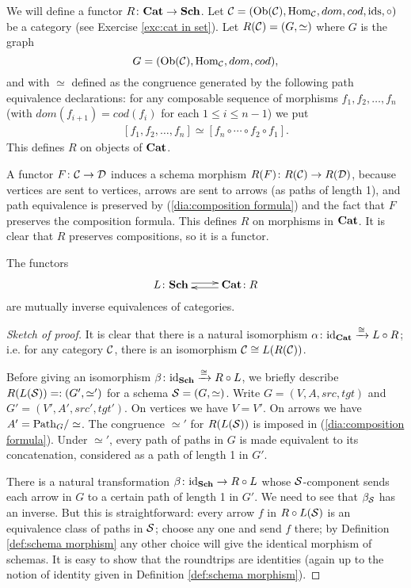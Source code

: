 \documentclass[CT4S-EN-RU]{subfiles}
\begin{document}
\begin{construction}

We will define a functor $R\colon{\bf Cat}\rightarrow{\bf Sch}$. Let $\mathcal{C}=(\textnormal{Ob}(\mathcal{C}),\textnormal{Hom}_\mathcal{C},dom,cod,\textnormal{ids},\circ)$ be a category (see Exercise \ref{exc:cat in set}). Let $R(\mathcal{C})=(G,\simeq)$ where $G$ is the graph $$G=(\textnormal{Ob}(\mathcal{C}),\textnormal{Hom}_\mathcal{C},dom,cod),$$ and with $\simeq$ defined as the congruence generated by the following path equivalence declarations: for any composable sequence of morphisms $f_1,f_2,\ldots,f_n$ (with $dom(f_{i+1})=cod(f_i)$ for each $1\leq i\leq n-1$) we put 
\begin{align}\label{dia:composition formula}
[f_1,f_2,\ldots,f_n]\simeq [f_n\circ\cdots\circ f_2\circ f_1].
\end{align} 
This defines $R$ on objects of ${\bf Cat}$. 

A functor $F\colon\mathcal{C}\rightarrow\mathcal{D}$ induces a schema morphism $R(F)\colon R(\mathcal{C})\rightarrow R(\mathcal{D})$, because vertices are sent to vertices, arrows are sent to arrows (as paths of length 1), and path equivalence is preserved by (\ref{dia:composition formula}) and the fact that $F$ preserves the composition formula. This defines $R$ on morphisms in ${\bf Cat}$. It is clear that $R$ preserves compositions, so it is a functor.

\end{construction}

\begin{theorem}\label{thm:equivalence of categories and schemas}

The functors $$\xymatrix{L\taking\Sch\ar@<.5ex>[r]&\Cat\!:R\ar@<.5ex>[l]}$$ are mutually inverse equivalences of categories.

\end{theorem}

\begin{proof}[Sketch of proof]

It is clear that there is a natural isomorphism $\alpha\colon\textnormal{id}_{\bf Cat}\xrightarrow{\cong} L\circ R$; i.e. for any category $\mathcal{C}$, there is an isomorphism $\mathcal{C}\cong L(R(\mathcal{C}))$. 

Before giving an isomorphism $\beta\colon\textnormal{id}_{\bf Sch}\xrightarrow{\cong}R\circ L$, we briefly describe $R(L(\mathcal{S}))=:(G',\simeq')$ for a schema $\mathcal{S}=(G,\simeq)$. Write $G=(V,A,src,tgt)$ and $G'=(V',A',src',tgt')$. On vertices we have $V=V'$. On arrows we have $A'=\textnormal{Path}_G/\simeq$. The congruence $\simeq'$ for $R(L(\mathcal{S}))$ is imposed in (\ref{dia:composition formula}). Under $\simeq'$, every path of paths in $G$ is made equivalent to its concatenation, considered as a path of length 1 in $G'$. 

There is a natural transformation $\beta\colon\textnormal{id}_{\bf Sch}\rightarrow R\circ L$ whose $\mathcal{S}$-component sends each arrow in $G$ to a certain path of length 1 in $G'$. We need to see that $\beta_\mathcal{S}$ has an inverse. But this is straightforward: every arrow $f$ in $R\circ L(\mathcal{S})$ is an  equivalence class of paths in $\mathcal{S}$; choose any one and send $f$ there; by Definition \ref{def:schema morphism} any other choice will give the identical morphism of schemas. It is easy to show that the roundtrips are identities (again up to the notion of identity given in Definition \ref{def:schema morphism}).

\end{proof}
\end{document}
